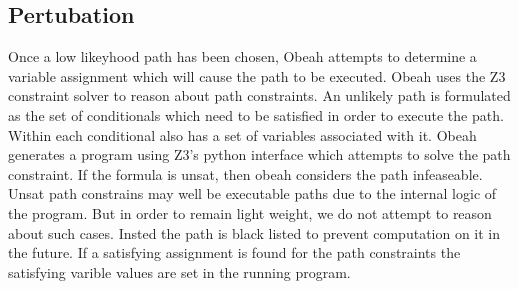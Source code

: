 \subsection{Pertubation}
\label{runtime-pertubation}

Once a low likeyhood path has been chosen, Obeah attempts to determine a
variable assignment which will cause the path to be executed. Obeah uses the Z3
constraint solver to reason about path constraints. An unlikely path is
formulated as the set of conditionals which need to be satisfied in order to
execute the path. Within each conditional also has a set of variables
associated with it. Obeah generates a program using Z3's python interface which
attempts to solve the path constraint. If the formula is unsat, then obeah
considers the path infeaseable. Unsat path constrains may well be executable
paths due to the internal logic of the program. But in order to remain light
weight, we do not attempt to reason about such cases. Insted the path is black
listed to prevent computation on it in the future. If a satisfying assignment
is found for the path constraints the satisfying varible values are set in the
running program.



